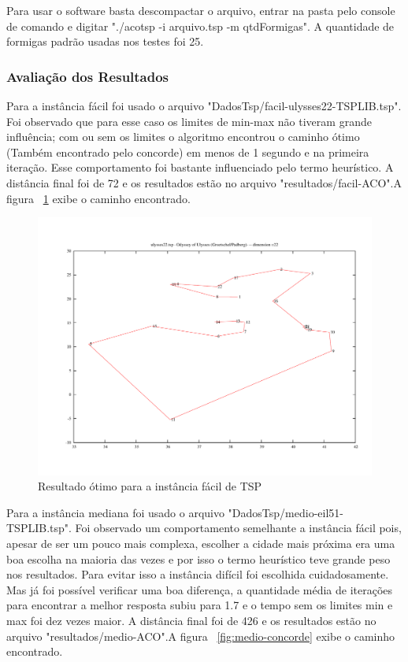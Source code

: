 \documentclass{acm_proc_article-sp}
\begin{document}
Para usar o software basta descompactar o arquivo, entrar na pasta pelo console de comando e digitar "./acotsp -i arquivo.tsp -m qtdFormigas". A quantidade de formigas padrão usadas nos testes foi 25.

\subsubsection{Avaliação dos Resultados}
Para a instância fácil foi usado o arquivo "DadosTsp/facil-ulysses22-TSPLIB.tsp". Foi observado que para esse caso os limites de min-max não tiveram grande influência; com ou sem os limites o algoritmo encontrou o caminho ótimo (Também encontrado pelo concorde) em menos de 1 segundo e na primeira iteração. Esse comportamento foi bastante influenciado pelo termo heurístico. A distância final foi de 72 e os resultados estão no arquivo "resultados/facil-ACO".A figura ~\ref{fig:facil-concorde} exibe o caminho encontrado.

\begin{figure}[ht]
 \begin{center}
  \includegraphics[scale=0.3]{imagens/facil_concorde.pdf} 
  \caption{Resultado ótimo para a instância fácil de TSP}
  \label{fig:facil-concorde}
 \end{center}
\end{figure}

Para a instância mediana foi usado o arquivo "DadosTsp/medio-eil51-TSPLIB.tsp". Foi observado um comportamento semelhante a instância fácil pois, apesar de ser um pouco mais complexa, escolher a cidade mais próxima era uma boa escolha na maioria das vezes e por isso o termo heurístico teve grande peso nos resultados. Para evitar isso a instância difícil foi escolhida cuidadosamente. Mas já foi possível verificar uma boa diferença, a quantidade média de iterações para encontrar a melhor resposta subiu para 1.7 e o tempo sem os limites min e max foi dez vezes maior. A  distância final foi de 426 e os resultados estão no arquivo "resultados/medio-ACO".A figura ~\ref{fig:medio-concorde} exibe o caminho encontrado.
\end{document}
